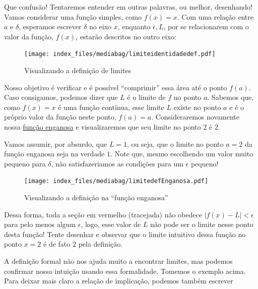 \documentclass[
  portuguese,
  letterpaper,
  DIV=11,
  numbers=noendperiod]{scrreport}
\begin{document}
Que confusão! Tentaremos entender em outras palavras, ou melhor,
desenhando! Vamos considerar uma função simples, como \(f(x) = x\). Com
uma relação entre \(a\) e \(\delta\), esperamos escrever \(\delta\) no
eixo \(x\), enquanto \(\epsilon, L\), por se relacionarem com o valor da
função, \(f(x)\), estarão descritos no outro eixo:

\begin{figure}[H]

\caption{Visualizando a definição de limites}

{\centering \texttt{[image: index\_files/mediabag/limiteidentidadedef.pdf]}

}

\end{figure}%

Nosso objetivo é verificar e é possível ``comprimir'' essa área até o
ponto \(f(a)\). Caso consigamos, podemos dizer que \(L\) é o limite de
\(f\) no ponto \(a\). Sabemos que, como \(f(x) = x\) é uma função
contínua, esse limite \(L\) existe no ponto \(a\) e é o próprio valor da
função neste ponto, \(f(a) = a\). Consideraremos novamente nossa
\hyperref[fig-enganosa]{função enganosa} e visualizaremos que seu limite
no ponto \(2\) é \(2\).

Vamos assumir, por absurdo, que \(L = 1\), ou seja, que o limite no
ponto \(a=2\) da função enganosa seja na verdade \(1\). Note que, mesmo
escolhendo um valor muito pequeno para \(\delta\), não satisfazeriamos
as condições para um \(\epsilon\) pequeno!

\begin{figure}[H]

\caption{Visualizando a definição na ``função enganosa''}

{\centering \texttt{[image: index\_files/mediabag/limitedefEnganosa.pdf]}

}

\end{figure}%

Dessa forma, toda a seção em vermelho (tracejada) não obedece
\(|f(x) - L| < \epsilon\) para pelo menos algum \(\epsilon\), logo, esse
valor de \(L\) não pode ser o limite nesse ponto desta função! Tente
desenhar e observar que o limite intuitivo dessa função no ponto \(x=2\)
é de fato \(2\) pela definição.

A definição formal não nos ajuda muito a encontrar limites, mas podemos
confirmar nossa intuição usando essa formalidade. Tomemos o exemplo
acima. Para deixar mais claro a relação de implicação, podemos também
escrever
\end{document}
